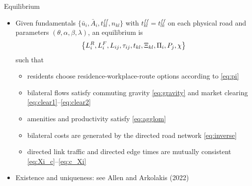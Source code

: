 \documentclass[11pt,aspectratio=169]{beamer}
\begin{document}
\begin{frame}{Equilibrium}
\begin{itemize}
  \item Given fundamentals $\{\bar u_i,\bar A_i,t_{kl}^{ff},n_{kl}\}$ with $t_{kl}^{ff}=t_{lk}^{ff}$ on each physical road and parameters $(\theta,\alpha,\beta,\lambda)$, an equilibrium is
  \vspace{-0.5em}\begin{equation}
    \left\{L_i^R,L_i^F,L_{ij},\tau_{ij},t_{kl},\Xi_{kl},\Pi_i,P_j,\chi\right\}
  \vspace{-0.5em}\end{equation}
  such that
  \begin{itemize}
    \item residents choose residence-workplace-route options according to \eqref{eq:pi}
    \item bilateral flows satisfy commuting gravity \eqref{eq:gravity} and market clearing \eqref{eq:clear1}--\eqref{eq:clear2}
    \item amenities and productivity satisfy \eqref{eq:agglom}
    \item bilateral costs are generated by the directed road network \eqref{eq:inverse}
    \item directed link traffic and directed edge times are mutually consistent \eqref{eq:Xi_c}--\eqref{eq:c_Xi}
  \end{itemize}
  \item Existence and uniqueness: see Allen and Arkolakis (2022)
\end{itemize}
\end{frame}
\end{document}
